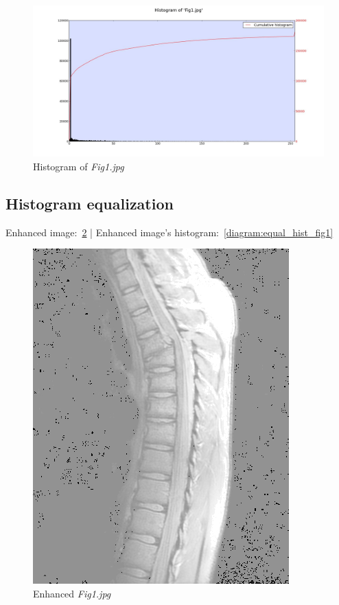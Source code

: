     \begin{figure}[!htb]\centering
        \includegraphics[width=\linewidth]{./images/1/Histogram_Fig1.jpg}
        \caption{Histogram of \textit{Fig1.jpg}}\label{diagram:hist_fig1}
    \end{figure}

    \pagebreak
    \subsection{Histogram equalization}

    Enhanced image:~\ref{diagram:enhanced_fig1} |
    Enhanced image's histogram:~\ref{diagram:equal_hist_fig1}

    \begin{figure}[!htb]\centering
        \includegraphics[width=0.5\linewidth]{./images/1/Enhanced_Fig1.jpg}
        \caption{Enhanced \textit{Fig1.jpg}}\label{diagram:enhanced_fig1}
    \end{figure}

